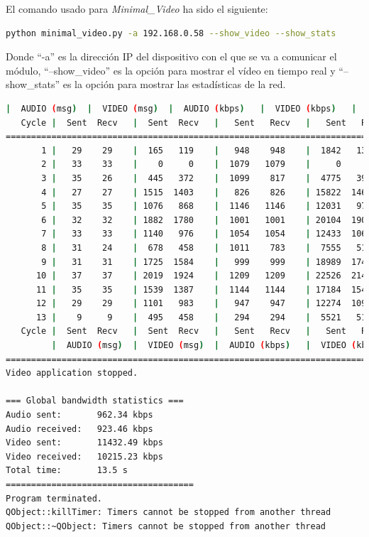 El comando usado para \textit{Minimal\_Video} ha sido el siguiente:
\begin{lstlisting}[language=bash]
python minimal_video.py -a 192.168.0.58 --show_video --show_stats
\end{lstlisting}
Donde ``-a'' es la dirección IP del dispositivo con el que se va a comunicar el módulo, ``--show\_video'' es la opción para mostrar el vídeo en tiempo real y ``--show\_stats'' es la opción para mostrar las estadísticas de la red.
\vspace{\baselineskip}

\begin{lstlisting}[language=bash,basicstyle=\ttfamily\tiny]
         |  AUDIO (msg)  |  VIDEO (msg)  |  AUDIO (kbps)   |  VIDEO (kbps)   |     CPU (%) 
   Cycle |  Sent  Recv   |  Sent  Recv   |   Sent   Recv   |   Sent   Recv   | Program System
================================================================================================
       1 |   29    29    |  165   119    |   948    948    |  1842   1330    |  21      0       
       2 |   33    33    |    0     0    |  1079   1079    |     0      0    |  38     76       
       3 |   35    26    |  445   372    |  1099    817    |  4775   3991    |  38     78       
       4 |   27    27    | 1515  1403    |   826    826    | 15822  14654    |  31     65       
       5 |   35    35    | 1076   868    |  1146   1146    | 12031   9705    |  40     70       
       6 |   32    32    | 1882  1780    |  1001   1001    | 20104  19018    |  40     71       
       7 |   33    33    | 1140   976    |  1054   1054    | 12433  10644    |  30     68       
       8 |   31    24    |  678   458    |  1011    783    |  7555   5105    |  43     70       
       9 |   31    31    | 1725  1584    |   999    999    | 18989  17437    |  28     67       
      10 |   37    37    | 2019  1924    |  1209   1209    | 22526  21467    |  46     74       
      11 |   35    35    | 1539  1387    |  1144   1144    | 17184  15485    |  45     70       
      12 |   29    29    | 1101   983    |   947    947    | 12274  10959    |  34     70       
      13 |    9     9    |  495   458    |   294    294    |  5521   5110    |   6     72       
   Cycle |  Sent  Recv   |  Sent  Recv   |   Sent   Recv   |   Sent   Recv   | Program System
         |  AUDIO (msg)  |  VIDEO (msg)  |  AUDIO (kbps)   |  VIDEO (kbps)   |     CPU (%) 
===========================================================================================
Video application stopped.

=== Global bandwidth statistics ===
Audio sent:       962.34 kbps
Audio received:   923.46 kbps
Video sent:       11432.49 kbps
Video received:   10215.23 kbps
Total time:       13.5 s
=====================================
Program terminated.
QObject::killTimer: Timers cannot be stopped from another thread
QObject::~QObject: Timers cannot be stopped from another thread
\end{lstlisting}
\vspace{\baselineskip}

